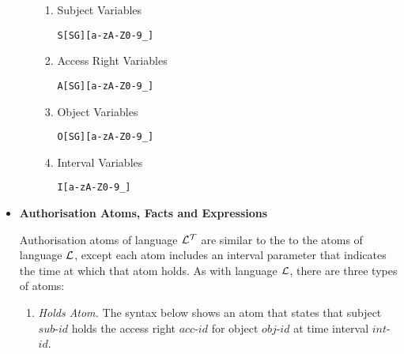 \documentclass[11pt]{report}
\newenvironment{vverbatim}
{
  \begin{alltt}
}
{
    \vspace{-\baselineskip}
  \end{alltt}
}
\begin{document}
\begin{itemize}
\begin{enumerate}
                    \begin{enumerate}
                      \item
                        Subject Variables

                        \begin{vverbatim}
  S[SG][a-zA-Z0-9\_]
                        \end{vverbatim}

                      \item
                        Access Right Variables

                        \begin{vverbatim}
  A[SG][a-zA-Z0-9\_]
                        \end{vverbatim}

                      \item
                        Object Variables

                        \begin{vverbatim}
  O[SG][a-zA-Z0-9\_]
                        \end{vverbatim}

                      \item
                        Interval Variables

                        \begin{vverbatim}
  I[a-zA-Z0-9\_]
                        \end{vverbatim}

                    \end{enumerate}
                \end{enumerate}

            \item
              {\bf Authorisation Atoms, Facts and Expressions}

              Authorisation atoms of language ${\cal L^T}$ are similar to the
              to the atoms of language ${\cal L}$, except each atom includes
              an interval parameter that indicates the time at which that atom
              holds. As with language ${\cal L}$, there are three types of
              atoms:

              \begin{enumerate}
                \item
                  {\em Holds Atom.} The syntax below shows an atom that states
                  that subject $sub$-$id$ holds the access right $acc$-$id$ for
                  object $obj$-$id$ at time interval $int$-$id$.


\end{enumerate}
\end{itemize}
\end{document}
